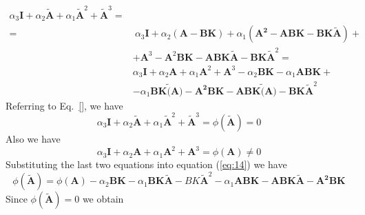 \documentclass[11pt,a4paper,oneside]{book}
\numberwithin{equation}{section}
\theoremstyle{it}
\theoremstyle{definition}
\begin{document}
\begin{equation} \label{ackermann_5}
	\begin{split}
		\alpha_3\mathbf{I}+\alpha_2\tilde{\mathbf{A}}+\alpha_1\tilde{\mathbf{A}}^2+\tilde{\mathbf{A}}^3 = & \\
		= & \:\alpha_3\mathbf{I}+\alpha_2\mathbf{(A-BK)}+\alpha_1(\mathbf{A^2-ABK-BK}\tilde{\mathbf{A}})+\\
		& +\mathbf{A}^3-\mathbf{A}^2\mathbf{BK} -\mathbf{ABK}\tilde{\mathbf{A}}-\mathbf{BK}\tilde{\mathbf{A}}^2 = \\
		& \alpha_3\mathbf{I}+\alpha_2\mathbf{A}+\alpha_1\mathbf{A}^2+\mathbf{A}^3-\alpha_2\mathbf{BK}-\alpha_1\mathbf{ABK}+\\
		&-\alpha_1\mathbf{BK}\tilde(\mathbf{A})-\mathbf{A^2BK-ABK}\tilde(\mathbf{A})-\mathbf{BK}\tilde{\mathbf{A}}^2
	\end{split}
\end{equation}
Referring to Eq.~\eqref{}, we have
\begin{equation*}
	\alpha_3\mathbf{I}+\alpha_2\tilde{\mathbf{A}}+\alpha_1 
	\tilde{\mathbf{A}}^2+\tilde{\mathbf{A}}^3=\phi(\tilde{\mathbf{A}})=0
\end{equation*}
Also we have
\begin{equation*}
	\alpha_3\mathbf{I}+\alpha_2\mathbf{A}+\alpha_1\mathbf{A}^2+ 
	\mathbf{A}^3=\phi(\mathbf{A})\not =0
\end{equation*}
Substituting the last two equations into equation (\ref{eq:14}) we have
\begin{equation*}
	\phi(\tilde{\mathbf{A}})=\phi(\mathbf{A})-\alpha_2\mathbf{BK}- 
	\alpha_1\mathbf{BK}\tilde{\mathbf{A}}-BK\tilde{\mathbf{A}}^2- 
	\alpha_1\mathbf{ABK-ABK}\tilde{\mathbf{A}}-\mathbf{A^2BK}
\end{equation*}
Since $\phi(\tilde{\mathbf{A}})=0$ we obtain
\end{document}
